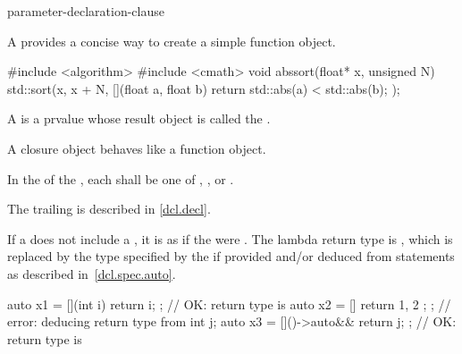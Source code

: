 \begin{bnf}
\br
    \terminal{[}  \terminal{]}
\end{bnf}

\begin{bnf}
\br
    \terminal{(} parameter-declaration-clause \terminal{)} \br
    \bnfindent{}   
\end{bnf}

\pnum
A  provides
a concise way to create a simple function object.
\begin{example}
\begin{codeblock}
#include <algorithm>
#include <cmath>
void abssort(float* x, unsigned N) {
  std::sort(x, x + N, [](float a, float b) { return std::abs(a) < std::abs(b); });
}
\end{codeblock}
\end{example}

\pnum
A  is a prvalue
whose result object is called the .
\begin{note}
A closure object behaves like a function
object.
\end{note}

\pnum
In the  of the ,
each 
shall be one of , , or .
\begin{note}
The trailing  is described in \ref{dcl.decl}.
\end{note}

\pnum
If a  does not include a
, it is as if the  were
\tcode{()}.
The lambda return type is , which is replaced by the
type specified by the
 if provided and/or deduced from
 statements as described in~\ref{dcl.spec.auto}.
\begin{example}
\begin{codeblock}
auto x1 = [](int i){ return i; };       // OK: return type is 
auto x2 = []{ return { 1, 2 }; };       // error: deducing return type from 
int j;
auto x3 = []()->auto&& { return j; };   // OK: return type is 
\end{codeblock}
\end{example}

